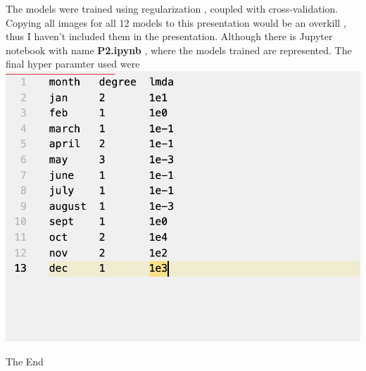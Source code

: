 \documentclass[11pt]{beamer}
\begin{document}
\begin{frame}
The models were trained using regularization , coupled with cross-validation. Copying all images for all 12 models to this presentation would be an overkill , thus I haven't included them in the presentation. Although there is Jupyter notebook with name \textbf{P2.ipynb} , where the models trained are represented. 
The final hyper paramter used were
\includegraphics[scale=0.4]{images/37.png}
\end{frame}


\begin{frame}
\begin{huge}
The End
\end{huge}
\end{frame}
\end{document}
